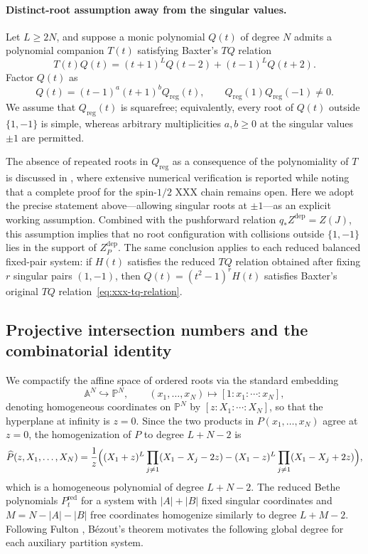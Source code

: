 \documentclass[11pt]{article}
\theoremstyle{definition}
\newcommand{\A}{\mathbb{A}}
\begin{document}
\paragraph{Distinct-root assumption away from the singular values.}
Let $L\ge 2N$, and suppose a monic polynomial $Q(t)$ of degree $N$ admits
a polynomial companion $T(t)$ satisfying Baxter's $TQ$ relation
\begin{equation}\label{eq:xxx-tq-relation}
	T(t)Q(t)=(t+1)^L Q(t-2)+(t-1)^L Q(t+2).
\end{equation}
Factor $Q(t)$ as
\[
Q(t)=(t-1)^a(t+1)^b Q_{\mathrm{reg}}(t),
\qquad Q_{\mathrm{reg}}(1)Q_{\mathrm{reg}}(-1)\ne 0.
\]
We assume that $Q_{\mathrm{reg}}(t)$ is squarefree; equivalently, every
root of $Q(t)$ outside $\{1,-1\}$ is simple, whereas arbitrary multiplicities $a,b\ge 0$ at the singular
values $\pm 1$ are permitted.

The absence of repeated roots in $Q_{\mathrm{reg}}$ as a consequence of the polynomiality of $T$ is
discussed in \cite[Introduction, eq.~(1.3) and footnote~2]{HJJ2024},
where extensive numerical verification is reported while noting that a complete proof for the
spin-$1/2$ XXX chain remains open.
Here we adopt the precise statement above---allowing singular roots at $\pm 1$---as an explicit working assumption.
Combined with the pushforward relation $q_*Z^{\mathrm{dep}}=Z(J)$, this assumption implies that no root configuration with collisions outside
$\{1,-1\}$ lies in the support of $Z^{\mathrm{dep}}_P$. The same conclusion
applies to each reduced balanced fixed-pair system: if $H(t)$ satisfies
the reduced $TQ$ relation obtained after fixing $r$ singular pairs $(1,-1)$, then
$Q(t)=(t^2-1)^r H(t)$ satisfies Baxter's original $TQ$ relation~\eqref{eq:xxx-tq-relation}.

\subsection{Projective intersection numbers and the combinatorial identity}
\label{sec:projective-intersection}

We compactify the affine space of ordered roots via the standard embedding
\[
\A^N\hookrightarrow\mathbb{P}^N,\qquad
(x_1,\ldots,x_N)\longmapsto[1:x_1:\cdots:x_N],
\]
denoting homogeneous coordinates on $\mathbb{P}^N$ by $[z:X_1:\cdots:X_N]$, so that the hyperplane at infinity is $z=0$. Since the two products in $P(x_1,\ldots,x_N)$ agree at $z=0$, the homogenization of $P$ to degree $L+N-2$ is
\[
\widehat{P}(z,X_1,\dots,X_N)=\frac{1}{z}\Bigl(
(X_1+z)^L\prod_{j\ne 1}(X_1-X_j-2z)
-
(X_1-z)^L\prod_{j\ne 1}(X_1-X_j+2z)\Bigr),
\]
which is a homogeneous polynomial of degree $L+N-2$. The reduced Bethe polynomials $P_t^{\mathrm{red}}$ for a system with $|A|+|B|$ fixed singular coordinates and $M=N-|A|-|B|$ free coordinates homogenize similarly to degree $L+M-2$. Following Fulton \cite{Fulton1998}, B\'ezout's theorem motivates the following global degree for each auxiliary partition system.
\end{document}
